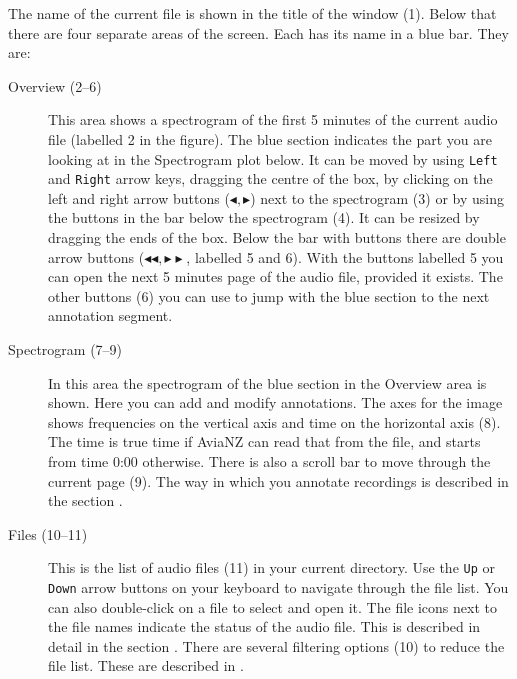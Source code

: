 \documentclass{scrartcl}
\begin{document}
The name of the current file is shown in the title of the window (1). Below that there are four separate areas of the screen. Each has its name in a blue bar. They are:
\begin{description}
	\item[Overview (2--6)] This area shows a spectrogram of the first 5 minutes of the current audio file (labelled 2 in the figure).
		The blue section indicates the part you are looking at in the Spectrogram plot below.
		It can be moved by using \texttt{Left} and \texttt{Right} arrow keys, dragging the centre of the box, by clicking on the left and right arrow buttons ($\blacktriangleleft, \blacktriangleright$) next to the spectrogram (3) or by using the buttons in the bar below the spectrogram (4).
		It can be resized by dragging the ends of the box.
		Below the bar with buttons there are double arrow buttons ($\blacktriangleleft\blacktriangleleft, \blacktriangleright\blacktriangleright$, labelled 5 and 6).
		With the buttons labelled 5 you can open the next 5 minutes page of the audio file, provided it exists.
		The other buttons (6) you can use to jump with the blue section to the next annotation segment.
	\item[Spectrogram (7--9)] In this area the spectrogram of the blue section in the Overview area is shown.
		Here you can add and modify annotations.
		The axes for the image shows frequencies on the vertical axis and time on the horizontal axis (8).
		The time is true time if AviaNZ can read that from the file, and starts from time 0:00 otherwise.
		There is also a scroll bar to move through the current page (9).
		The way in which you annotate recordings is described in the section .
	\item [Files (10--11)] This is the list of audio files (11) in your current directory.
		Use the \texttt{Up} or \texttt{Down} arrow buttons on your keyboard to navigate through the file list.
		You can also double-click on a file to select and open it.
		The file icons next to the file names indicate the status of the audio file. 
		This is described in detail in the section .
		There are several filtering options (10) to reduce the file list. 
		These are described in .


\end{description}
\end{document}
